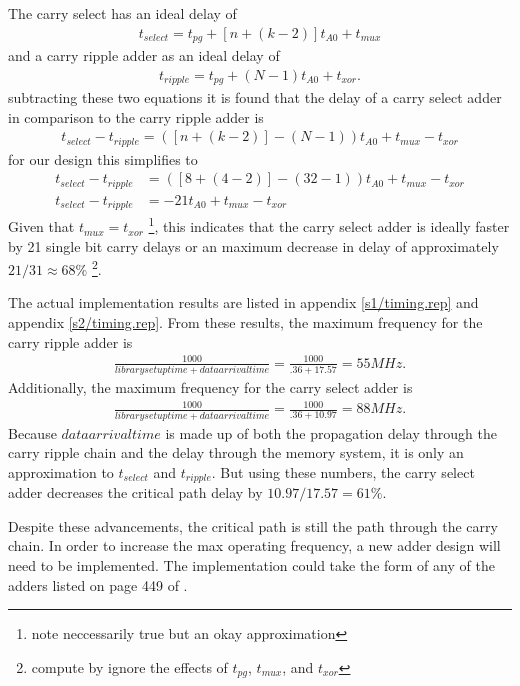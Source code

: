 \documentclass[11pt,letterpaper,final]{article}
\begin{document}
The carry select has an ideal delay of 
\begin{align}
t_{select} = t_{pg} + [ n + (k-2)] t_{A0} + t_{mux}
\end{align}
and a carry ripple adder as an ideal delay of 
\begin{align}
t_{ripple} = t_{pg} + (N-1) t_{A0} + t_{xor} .
\end{align}
subtracting these two equations it is found that the delay of a carry select 
adder in comparison to the carry ripple adder is
\begin{align}
t_{select} - t_{ripple} = ([ n + (k-2)] - (N-1))  t_{A0} + t_{mux} - t_{xor}
\end{align}
for our design this simplifies to 
\begin{align}
t_{select} - t_{ripple} &= ([8 + (4-2)] - (32-1)) t_{A0} + t_{mux} - t_{xor} \\
t_{select} - t_{ripple} &= -21 t_{A0} + t_{mux} - t_{xor}
\end{align}
Given that $ t_{mux} = t_{xor} $ \footnote{note neccessarily true but an okay approximation}, 
this indicates that the carry select adder is ideally faster by 21 single bit carry 
delays or an maximum decrease in delay of approximately $ 21 / 31 \approx 68\% $ \footnote{compute by ignore the effects of $ t_{pg} $, $ t_{mux} $, and $ t_{xor} $}.

The actual implementation results are listed in appendix \ref{s1/timing.rep} and 
appendix \ref{s2/timing.rep}.  From these results, the maximum frequency for the 
carry ripple adder is
\begin{align}
\frac{1000}{librarysetuptime + dataarrivaltime} = \frac{1000}{.36 + 17.57} = 55 MHz.
\end{align}
Additionally, the maximum frequency for the carry select adder is 
\begin{align}
\frac{1000}{librarysetuptime + dataarrivaltime} = \frac{1000}{.36 + 10.97} = 88 MHz.
\end{align}
Because $dataarrivaltime$ is made up of both the propagation delay through the 
carry ripple chain and the delay through the memory system, it is only an 
approximation to $t_{select}$ and $t_{ripple}$.  But using these numbers, the carry 
select adder decreases the critical path delay by $ 10.97 / 17.57  = 61\% $.

Despite these advancements, the critical path is still the path through the 
carry chain.  In order to increase the max operating frequency, a new 
adder design will need to be implemented.  The implementation could take the 
form of any of the adders listed on page 449 of \cite{cmosvlsi}.  
\end{document}
